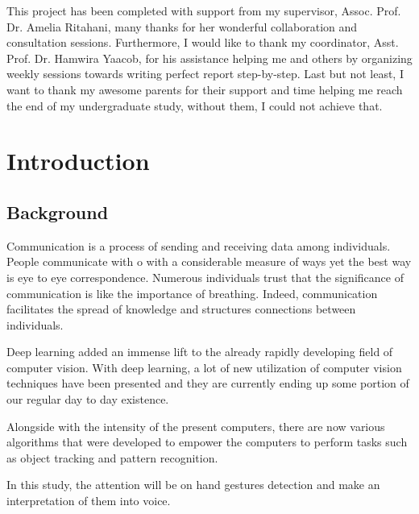 \documentclass[12pt]{report}
\begin{document}
        This project has been completed with support from my supervisor, Assoc. Prof. Dr. Amelia Ritahani, many thanks for her wonderful 
        collaboration and consultation sessions. Furthermore, 
        I would like to thank my coordinator, Asst. Prof. Dr. Hamwira Yaacob, for his 
        assistance helping me and others by organizing weekly sessions towards writing perfect report step-by-step. 
        Last but not least,
        I want to thank my awesome parents for their support and time helping me reach the end of my undergraduate study, without them, I could not achieve that.
                   
    \setcounter{page}{2}                    
    \tableofcontents{}
    \listoffigures
    \listoftables
    \newpage

    \chapter{Introduction} 

        \section{Background}
                Communication is a process of sending and receiving data among individuals. 
                People communicate with o with a considerable measure of ways yet the best way is eye to eye correspondence.
                Numerous individuals trust that the significance of communication 
                is like the importance of breathing. Indeed, communication facilitates the spread of knowledge
                and structures connections between individuals.
            
                Deep learning added an immense lift to the already rapidly developing field of computer vision.
                With deep learning, a lot of new utilization of computer vision techniques have been presented
                and they are currently ending up some portion of our regular day to day existence.
            
                Alongside with the intensity of the present computers, there are now various algorithms that were developed 
                to empower the computers to perform tasks such as object tracking and pattern recognition. 
                
                In this study, the attention will be on hand gestures detection and make an interpretation of them into voice.
\end{document}

